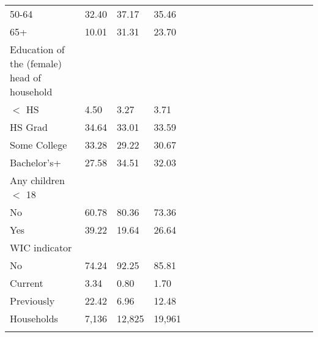 \begin{table}
\begin{center}
\begin{tabularx} {14cm} {@{} l Y Y Y Y Y Y Y Y Y Y Y Y Y Y Y Y@{}}
50-64&32.40&37.17&35.46 \\
65+&10.01&31.31&23.70 \\
\midrule
Education of the (female) head of household&&& \\
$<$ HS&4.50&3.27&3.71 \\
HS Grad&34.64&33.01&33.59 \\
Some College&33.28&29.22&30.67 \\
Bachelor's+&27.58&34.51&32.03 \\
\midrule
Any children $<$ 18&&& \\
No&60.78&80.36&73.36 \\
Yes&39.22&19.64&26.64 \\
\midrule
WIC indicator&&& \\
No&74.24&92.25&85.81 \\
Current&3.34&0.80&1.70 \\
Previously&22.42&6.96&12.48 \\
\midrule
Households &7,136&12,825&19,961 \\
\bottomrule
\addlinespace[.75ex]
\end{tabularx}
\par
\scriptsize{}
\normalsize
\end{center}
\end{table}
